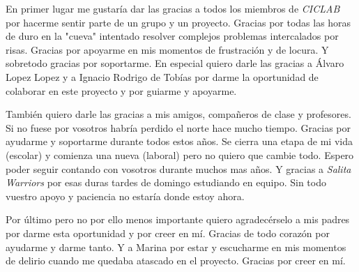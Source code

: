En primer lugar me gustaría dar las gracias a todos los miembros de \textit{CICLAB} por hacerme sentir parte de un grupo y un proyecto. Gracias por todas las horas de duro en la "cueva" intentado resolver complejos problemas intercalados por risas. Gracias por apoyarme en mis momentos de frustración y de locura. Y sobretodo gracias por soportarme. En especial quiero darle las gracias a Álvaro Lopez Lopez y a Ignacio Rodrigo de Tobías por darme la oportunidad de colaborar en este proyecto y por guiarme y apoyarme. 

También quiero darle las gracias a mis amigos, compañeros de clase y profesores. Si no fuese por vosotros habría perdido el norte hace mucho tiempo. Gracias por ayudarme y soportarme durante todos estos años. Se cierra una etapa de mi vida (escolar) y comienza una nueva (laboral) pero no quiero que cambie todo. Espero poder seguir contando con vosotros durante muchos mas años. Y gracias a \textit{Salita Warriors} por esas duras tardes de domingo estudiando en equipo. Sin todo vuestro apoyo y paciencia no estaría donde estoy ahora.

Por último pero no por ello menos importante quiero agradecérselo a mis padres por darme esta oportunidad y por creer en mí. Gracias de todo corazón por ayudarme y darme tanto. Y a Marina por estar y escucharme en mis momentos de delirio cuando me quedaba atascado en el proyecto. Gracias por creer en mí.